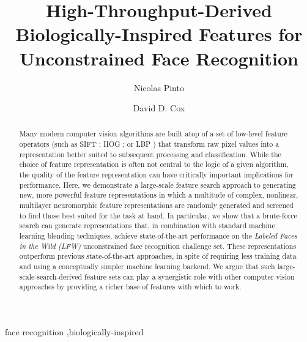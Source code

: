 \documentclass[preprint, 12pt]{elsarticle}
\begin{document}
\begin{frontmatter}

\title{
High-Throughput-Derived Biologically-Inspired Features for Unconstrained Face Recognition
}

\author[rowland,mit]{Nicolas Pinto}

\author[rowland]{David D. Cox}

\address[rowland]{The Rowland Institute at Harvard, Harvard University, Cambridge, MA 02142}
\address[mit]{McGovern Institute for Brain Research at MIT, Cambridge, MA 02139}


\begin{abstract}
Many modern computer vision algorithms are built atop of a set of low-level
feature operators (such as SIFT \cite{sift,luo2007person}; HOG \cite{dalal2005hog,albiol2008face}; or LBP
\cite{ahonen2004face,ahonen2006face}) that transform raw pixel values into a representation better
suited to subsequent processing and classification.  While the choice of feature
representation is often not central to the logic of a given algorithm, the
quality of the feature representation can have critically important implications
for performance.  Here, we demonstrate a large-scale feature search approach to
generating new, more powerful feature representations in which a multitude of
complex, nonlinear, multilayer neuromorphic feature representations are randomly
generated and screened to find those best suited for the task at hand.  In
particular, we show that a brute-force search can generate representations that,
in combination with standard machine learning blending techniques, achieve
state-of-the-art performance on the \emph{Labeled Faces in the Wild (LFW)} \cite{huang:lfw}
unconstrained face recognition challenge set.  These representations outperform
previous state-of-the-art approaches, in spite of requiring less training data
and using a conceptually simpler machine learning backend.  We argue that such
large-scale-search-derived feature sets can play a synergistic role with other
computer vision approaches by providing a richer base of features with which to
work.

\end{abstract}

\begin{keyword}
face recognition \sep biologically-inspired
\end{keyword}

\end{frontmatter}
\end{document}
